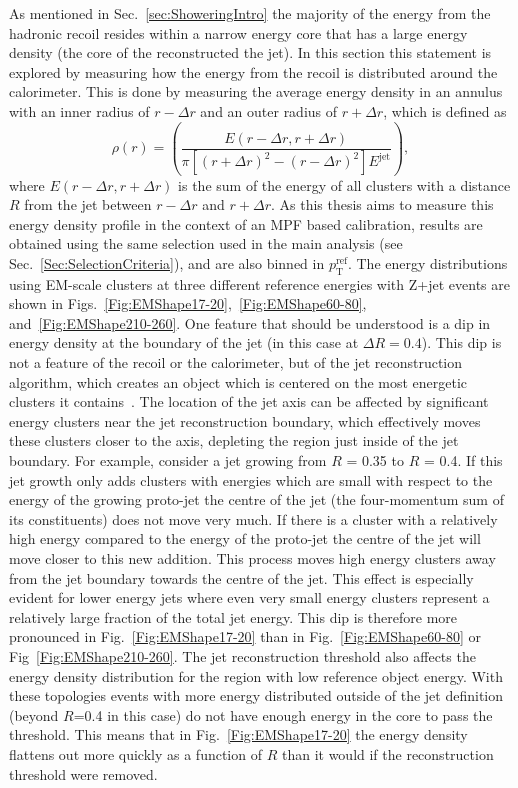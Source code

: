 As mentioned in Sec.~\ref{sec:ShoweringIntro} the majority of the energy from the hadronic recoil resides within a narrow energy core that has a large energy density (the core of the reconstructed the jet).  
In this section this statement is explored by measuring how the energy from the recoil is distributed around the calorimeter.  
This is done by measuring the average energy density in an annulus with an inner radius of $r-\Delta r$ and an outer radius of $r+\Delta r$, which is defined as
\begin{equation}
  \rho\left(r\right)  = \left( \frac{ E\left(r-\Delta r, r+\Delta r\right)}{\pi \left[\left(r +\Delta r\right)^2-\left(r -\Delta r\right)^2\right] E^{\mathrm{jet}}}\right), 
\end{equation}
where $E\left(r-\Delta r, r+\Delta r\right)$ is the sum of the energy of all clusters with a distance $R$ from the jet between $r-\Delta r$ and  $r+\Delta r$.  
As this thesis aims to measure this energy density profile in the context of an MPF based calibration, results are obtained using the same selection used in the main analysis (see Sec.~\ref{Sec:SelectionCriteria}), and are also binned in $p_{\mathrm T}^{\mathrm{ref}}$.  
The energy distributions using EM-scale clusters at three different reference energies with Z+jet events are shown in Figs.~\ref{Fig:EMShape17-20},~\ref{Fig:EMShape60-80}, and~\ref{Fig:EMShape210-260}.  
One feature that should be understood is a dip in energy density at the boundary of the jet (in this case at $\Delta R = 0.4$).  
This dip is not a feature of the recoil or the calorimeter, but of the jet reconstruction algorithm, which creates an object which is centered on the most energetic clusters it contains~\cite{Choudalakis:1248716}.  
The location of the jet axis can be affected by significant energy clusters near the jet reconstruction boundary, which effectively moves these clusters closer to the axis, depleting the region just inside of the jet boundary.  
For example, consider a jet growing from $R$ = 0.35 to $R$ = 0.4.  
If this jet growth only adds clusters with energies which are small with respect to the energy of the growing proto-jet the centre of the jet (the four-momentum sum of its constituents) does not move very much.  
If there is a cluster with a relatively high energy compared to the energy of the proto-jet the centre of the jet will move closer to this new addition.  
This process moves high energy clusters away from the jet boundary towards the centre of the jet.  
This effect is especially evident for lower energy jets where even very small energy clusters represent a relatively large fraction of the total jet energy.  
This dip is therefore more pronounced in Fig.~\ref{Fig:EMShape17-20} than in Fig.~\ref{Fig:EMShape60-80} or Fig~\ref{Fig:EMShape210-260}.  
The jet reconstruction threshold also affects the energy density distribution for the region with low reference object energy.  
With these topologies events with more energy distributed outside of the jet definition (beyond $R$=0.4 in this case) do not have enough energy in the core to pass the threshold.  
This means that in Fig.~\ref{Fig:EMShape17-20} the energy density flattens out more quickly as a function of $R$ than it would if the reconstruction threshold were removed.  


